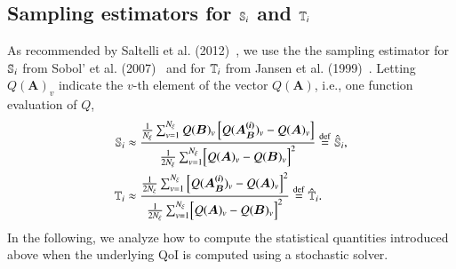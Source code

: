 \subsection{Sampling estimators for \texorpdfstring{$\S{i}$}{Si} and \texorpdfstring{$\T{i}$}{Ti}} \label{subsec:saltelli-est}
As recommended by Saltelli et al. (2012)~\cite{saltelli-etal-2012}, we use the 
the sampling estimator for $\S{i}$ from Sobol' et al. (2007)~\cite{sobol-etal-2007} and for $\T{i}$ from Jansen et al. (1999)~\cite{jansen-1999}. 
Letting $Q(\bm{A})_v$ indicate the $v$-th element of the vector $Q(\bm{A})$, i.e., one function evaluation of $Q$, 
\begin{align} \label{eq:saltelli-si}
    \S{i} &\approx \frac{\frac{1}{\Nxi} \sumv Q(\bm{B})_v \left[ Q(\bm{A_B^{(i)}})_v - Q(\bm{A})_v \right]}{\frac{1}{2\Nxi} \sumv \Bigl[ Q(\bm{A})_v - Q(\bm{B})_v \Bigr]^2} \defin \Ssalt{i}, \\ \label{eq:saltelli-ti}
    \T{i} &\approx \frac{ \frac{1}{2\Nxi} \sumv \left[ Q(\bm{A_B^{(i)}})_v - Q(\bm{A})_v \right]^2}{\frac{1}{2\Nxi} \sumv \Bigl[ Q(\bm{A})_v - Q(\bm{B})_v \Bigr]^2} \defin \Tsalt{i} .
\end{align}
In the following, we analyze how to compute the statistical quantities introduced above when the underlying QoI is computed using a stochastic solver.